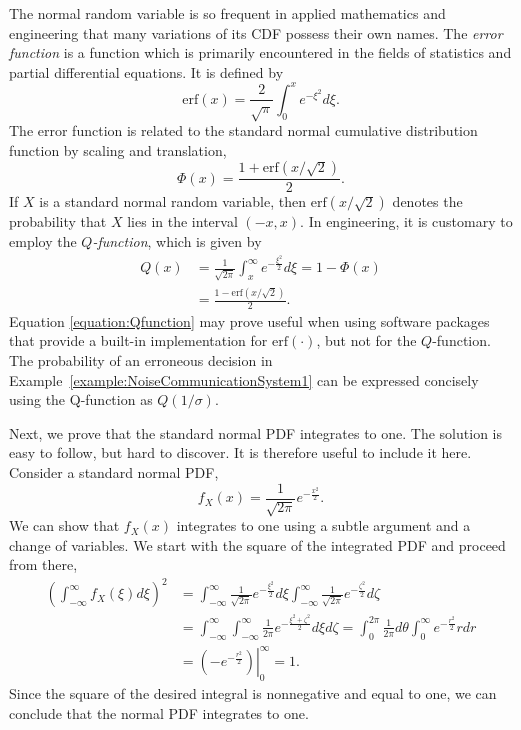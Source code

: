 The normal random variable is so frequent in applied mathematics and engineering that many variations of its CDF possess their own names.
The \emph{error function} is a function which is primarily encountered in the fields of statistics and partial differential equations. 
It is defined by
\begin{equation*}
\mathrm{erf} (x) = \frac{2}{\sqrt{\pi}} \int_0^x e^{-\xi^2} d\xi .
\end{equation*}
The error function is related to the standard normal cumulative distribution function by scaling and translation,
\begin{equation*}
\Phi (x) = \frac{1 + \mathrm{erf} \left( {x}/{\sqrt{2}} \right)}{2}.
\end{equation*}
If $X$ is a standard normal random variable, then $\mathrm{erf} \left( x/{\sqrt{2}} \right)$ denotes the probability that $X$ lies in the interval $(-x, x)$.
In engineering, it is customary to employ the \emph{$Q$-function}, which is given by 
\begin{equation} \label{equation:Qfunction}
\begin{split}
Q (x) &= \frac{1}{\sqrt{2 \pi}} \int_x^{\infty} e^{-\frac{\xi^2}{2}} d\xi
= 1 - \Phi (x) \\
&= \frac{ 1 - \mathrm{erf} \left( {x}/{\sqrt{2}} \right) }{2} .
\end{split}
\end{equation}
Equation \eqref{equation:Qfunction} may prove useful when using software packages that provide a built-in implementation for $\mathrm{erf}(\cdot)$, but not for the $Q$-function.
The probability of an erroneous decision in Example~\ref{example:NoiseCommunicationSystem1} can be expressed concisely using the Q-function as $Q (1/\sigma)$.


Next, we prove that the standard normal PDF integrates to one.
The solution is easy to follow, but hard to discover.
It is therefore useful to include it here.
Consider a standard normal PDF,
\begin{equation*}
f_X(x) = \frac{1}{\sqrt{2 \pi}} e^{- \frac{x^2}{2}} .
\end{equation*}
We can show that $f_X (x)$ integrates to one using a subtle argument and a change of variables.
We start with the square of the integrated PDF and proceed from there,
\begin{equation*}
\begin{split}
\left(\int_{- \infty}^{\infty} f_X (\xi) d\xi \right)^2
&= \int_{- \infty}^{\infty} \frac{1}{\sqrt{2 \pi}} e^{- \frac{\xi^2}{2}} d\xi
\int_{- \infty}^{\infty} \frac{1}{\sqrt{2 \pi}} e^{- \frac{\zeta^2}{2}} d\zeta \\
&= \int_{- \infty}^{\infty} \int_{- \infty}^{\infty}
\frac{1}{2 \pi} e^{- \frac{\xi^2 + \zeta^2}{2}} d\xi d\zeta
= \int_{0}^{2 \pi} \frac{1}{2 \pi} d\theta
\int_{0}^{\infty} e^{- \frac{r^2}{2}} r dr \\
&= \left. \left( - e^{- \frac{r^2}{2}} \right) \right|_0^{\infty} = 1.
\end{split}
\end{equation*}
Since the square of the desired integral is nonnegative and equal to one, we can conclude that the normal PDF integrates to one.


